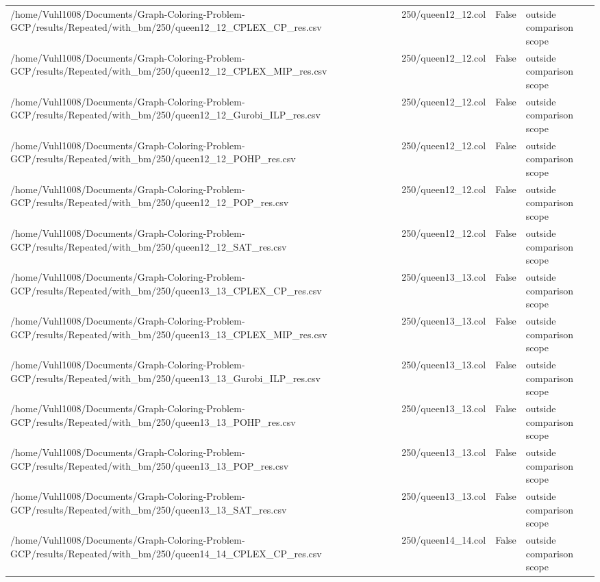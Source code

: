 \begin{table}[htbp]
\begin{tabular}{llll}
/home/Vuhl1008/Documents/Graph-Coloring-Problem-GCP/results/Repeated/with\_bm/250/queen12\_12\_CPLEX\_CP\_res.csv & 250/queen12\_12.col & False & outside comparison scope \\
/home/Vuhl1008/Documents/Graph-Coloring-Problem-GCP/results/Repeated/with\_bm/250/queen12\_12\_CPLEX\_MIP\_res.csv & 250/queen12\_12.col & False & outside comparison scope \\
/home/Vuhl1008/Documents/Graph-Coloring-Problem-GCP/results/Repeated/with\_bm/250/queen12\_12\_Gurobi\_ILP\_res.csv & 250/queen12\_12.col & False & outside comparison scope \\
/home/Vuhl1008/Documents/Graph-Coloring-Problem-GCP/results/Repeated/with\_bm/250/queen12\_12\_POHP\_res.csv & 250/queen12\_12.col & False & outside comparison scope \\
/home/Vuhl1008/Documents/Graph-Coloring-Problem-GCP/results/Repeated/with\_bm/250/queen12\_12\_POP\_res.csv & 250/queen12\_12.col & False & outside comparison scope \\
/home/Vuhl1008/Documents/Graph-Coloring-Problem-GCP/results/Repeated/with\_bm/250/queen12\_12\_SAT\_res.csv & 250/queen12\_12.col & False & outside comparison scope \\
/home/Vuhl1008/Documents/Graph-Coloring-Problem-GCP/results/Repeated/with\_bm/250/queen13\_13\_CPLEX\_CP\_res.csv & 250/queen13\_13.col & False & outside comparison scope \\
/home/Vuhl1008/Documents/Graph-Coloring-Problem-GCP/results/Repeated/with\_bm/250/queen13\_13\_CPLEX\_MIP\_res.csv & 250/queen13\_13.col & False & outside comparison scope \\
/home/Vuhl1008/Documents/Graph-Coloring-Problem-GCP/results/Repeated/with\_bm/250/queen13\_13\_Gurobi\_ILP\_res.csv & 250/queen13\_13.col & False & outside comparison scope \\
/home/Vuhl1008/Documents/Graph-Coloring-Problem-GCP/results/Repeated/with\_bm/250/queen13\_13\_POHP\_res.csv & 250/queen13\_13.col & False & outside comparison scope \\
/home/Vuhl1008/Documents/Graph-Coloring-Problem-GCP/results/Repeated/with\_bm/250/queen13\_13\_POP\_res.csv & 250/queen13\_13.col & False & outside comparison scope \\
/home/Vuhl1008/Documents/Graph-Coloring-Problem-GCP/results/Repeated/with\_bm/250/queen13\_13\_SAT\_res.csv & 250/queen13\_13.col & False & outside comparison scope \\
/home/Vuhl1008/Documents/Graph-Coloring-Problem-GCP/results/Repeated/with\_bm/250/queen14\_14\_CPLEX\_CP\_res.csv & 250/queen14\_14.col & False & outside comparison scope \\

\end{tabular}
\end{table}
